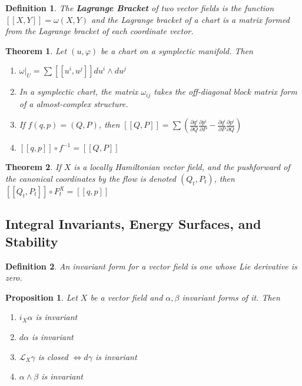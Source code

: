 \documentclass{article}
\newtheorem{thm}{Theorem}
\newtheorem{defn}{Definition}
\newtheorem{prop}{Proposition}
\begin{document}
\begin{defn}

The \textbf{Lagrange Bracket} of two vector fields is the function $ [[X,Y]] = \omega(X,Y) $ and the Lagrange bracket of a chart is a matrix formed from the Lagrange bracket of each coordinate vector.

\end{defn}

\begin{thm}

Let $(u, \varphi)$ be a chart on a symplectic manifold. Then

\begin{enumerate}
    \item $\omega \vert_U = \sum [[u^i, u^j]]du^i \wedge du^j$
    \item In a symplectic chart, the matrix $\omega_{ij}$ takes the off-diagonal block matrix form of a almost-complex structure.
    \item If $f(q,p) = (Q,P)$, then $[[Q,P]] = \sum \left( \frac{\partial q^i}{\partial Q} \frac{\partial p^i}{\partial P}   - \frac{\partial q^i}{\partial P} \frac{\partial p^i}{\partial Q} \right) $ 
    \item $ [[q,p]]\circ f^{-1} = [[Q, P]] $
\end{enumerate}

\end{thm}

\begin{thm}

If $X$ is a locally Hamiltonian vector field, and the pushforward of the canonical coordinates by the flow is denoted $(Q_t,P_t)$, then $[[Q_t,P_t]]\circ F^X_t = [[q,p]]$

\end{thm}

\subsection{Integral Invariants, Energy Surfaces, and Stability}

\begin{defn}

An invariant form for a vector field is one whose Lie derivative is zero.

\end{defn}

\begin{prop}

Let $X$ be a vector field and $\alpha, \beta$ invariant forms of it. Then 
\begin{enumerate}
    \item $i_X\alpha$ is invariant
    \item $d\alpha$ is invariant
    \item $\mathcal{L}_X \gamma$ is closed $\iff d\gamma$ is invariant
    \item $\alpha \wedge \beta$ is invariant
\end{enumerate}

\end{prop}
\end{document}
